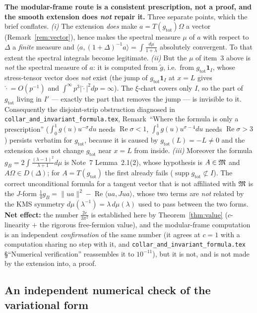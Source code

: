 \documentclass[11pt]{article}
\newcommand{\Om}{\Omega}
\newcommand{\ip}[2]{\langle#1,#2\rangle}
\newcommand{\norm}[1]{\lVert#1\rVert}
\newcommand{\gB}{g_B}
\newcommand{\gt}{\widetilde g}
\newcommand{\gtot}{g_{\mathrm{tot}}}
\newcommand{\supp}{\operatorname{supp}}
\begin{document}
\begin{verdictgap}
\textbf{The modular-frame route is a consistent prescription, not a proof, and the smooth extension does
\emph{not} repair it.}  Three separate points, which the brief conflates.
\emph{(i)} The extension \emph{does} make $a=T(\gtot)\Om$ a vector (Remark~\ref{rem:vector}), hence makes the
spectral measure $\mu$ of $a$ with respect to $\Delta$ a \emph{finite} measure and
$\ip a{(1+\Delta)^{-1}a}=\int\frac{d\mu}{1+\lambda}$ absolutely convergent.  To that extent the spectral
integrals become legitimate.
\emph{(ii)} But the $\mu$ of item~3 above is \emph{not} the spectral measure of $a$: it is computed from
$\gt$, i.e.\ from $\gtot\mathbf 1_I$, whose stress-tensor vector does \emph{not} exist
(the jump of $\gtot\mathbf 1_I$ at $x=L$ gives $\widehat{\cdot}=O(p^{-1})$ and
$\int^\infty p^3|\widehat\cdot|^2dp=\infty$).  The $\xi$-chart covers only $I$, so the part of $\gtot$
living in $I'$ --- exactly the part that removes the jump --- is invisible to it.  Consequently the
disjoint-strip obstruction diagnosed in \texttt{collar\_and\_invariant\_formula.tex},
Remark~``Where the formula is only a prescription'' ($\int_0^1g(u)u^{-\sigma}du$ needs
$\operatorname{Re}\sigma<1$, $\int_0^1g(u)u^{\sigma-4}du$ needs $\operatorname{Re}\sigma>3$) persists
verbatim for $\gtot$, because it is caused by $\gtot(L)=-L\neq0$ and the extension does not change
$\gtot$ near $x=L$ from inside.
\emph{(iii)} Moreover the formula $\gB=2\int\frac{(\lambda-1)^2}{\lambda+1}d\mu$ is
Note~7 Lemma~2.1(2), whose hypothesis is $A\in\mathfrak M$ and $A\Om\in D(\Delta)$; for $A=T(\gtot)$ the first
already fails ($\supp\gtot\not\subset I$).  The correct unconditional formula for a tangent vector that is
not affiliated with $\mathfrak M$ is the $J$-form $\frac14\gB=\norm{ua}^2-\operatorname{Re}\ip{ua}{Jua}$, whose two
terms are \emph{not} related by the KMS symmetry $d\mu(\lambda^{-1})=\lambda\,d\mu(\lambda)$ used to pass
between the two forms.
\textbf{Net effect:} the number $\frac{2c}{3\pi^2}$ is established here by Theorem~\ref{thm:value}
($c$-linearity $+$ the rigorous free-fermion value), and the modular-frame computation is an independent
\emph{confirmation} of the same number (it agrees at $c=1$ with a computation sharing no step with it, and
\texttt{collar\_and\_invariant\_formula.tex} \S{}``Numerical verification'' reassembles it to $10^{-11}$),
but it is not, and is not made by the extension into, a proof.
\end{verdictgap}

\subsection{An independent numerical check of the variational form}\label{sec:num}
\end{document}
